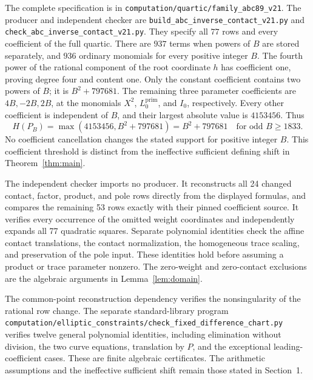 \documentclass[11pt,a4paper]{article}
\begin{document}
The complete specification is in
\nolinkurl{computation/quartic/family_abc89_v21}. The producer and
independent checker are
\nolinkurl{build_abc_inverse_contact_v21.py} and
\nolinkurl{check_abc_inverse_contact_v21.py}. They specify all $77$ rows
and every coefficient of the full quartic. There are $937$ terms when
powers of $B$ are stored separately, and $936$ ordinary monomials for
every positive integer $B$. The fourth power of the rational component
of the root coordinate $h$ has coefficient one, proving degree four
and content one. Only the constant coefficient contains two powers of
$B$; it is $B^2+797681$. The remaining three parameter coefficients
are $4B,-2B,2B$, at the monomials $X^2$, $L_0^{\mathrm{prim}}$,
and $I_0$, respectively. Every other coefficient is independent of
$B$, and their largest absolute value is $4153456$. Thus
\[
 H(P_B)=\max(4153456,B^2+797681)
       =B^2+797681\quad\text{for odd }B\ge1833.
\]
No coefficient cancellation changes the stated support for positive
integer $B$. This coefficient threshold is distinct from the
ineffective sufficient defining shift in Theorem~\ref{thm:main}.

The independent checker imports no producer. It reconstructs all
24 changed contact, factor, product, and pole rows directly from the
displayed formulas, and compares the remaining 53 rows exactly with
their pinned coefficient source. It verifies every occurrence of the
omitted weight coordinates and independently expands all 77 quadratic
squares. Separate polynomial identities check the affine contact
translations, the contact normalization, the homogeneous trace scaling,
and preservation of the pole input. These identities hold before
assuming a product or trace parameter nonzero. The zero-weight and
zero-contact exclusions are the algebraic arguments in
Lemma~\ref{lem:domain}.

The common-point reconstruction dependency verifies the nonsingularity
of the rational row change. The separate standard-library program
\nolinkurl{computation/elliptic_constraints/check_fixed_difference_chart.py}
verifies twelve general polynomial identities, including elimination
without division, the two curve equations, translation by $P$, and the
exceptional leading-coefficient cases. These are finite algebraic
certificates. The arithmetic assumptions and the ineffective sufficient
shift remain those stated in Section~1.
\end{document}
